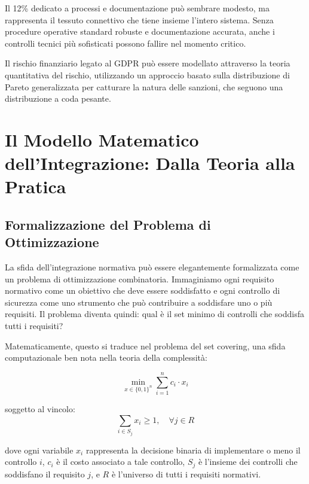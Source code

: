 Il 12\% dedicato a processi e documentazione può sembrare modesto, ma rappresenta il tessuto connettivo che tiene insieme l'intero sistema. Senza procedure operative standard robuste e documentazione accurata, anche i controlli tecnici più sofisticati possono fallire nel momento critico.

Il rischio finanziario legato al GDPR può essere modellato attraverso la teoria quantitativa del rischio\autocite{mcneil2015}, utilizzando un approccio basato sulla distribuzione di Pareto generalizzata per catturare la natura delle sanzioni, che seguono una distribuzione a coda pesante.

\section{Il Modello Matematico dell'Integrazione: Dalla Teoria alla Pratica}

\subsection{Formalizzazione del Problema di Ottimizzazione}

La sfida dell'integrazione normativa può essere elegantemente formalizzata come un problema di ottimizzazione combinatoria. Immaginiamo ogni requisito normativo come un obiettivo che deve essere soddisfatto e ogni controllo di sicurezza come uno strumento che può contribuire a soddisfare uno o più requisiti. Il problema diventa quindi: qual è il set minimo di controlli che soddisfa tutti i requisiti?

Matematicamente, questo si traduce nel problema del set covering, una sfida computazionale ben nota nella teoria della complessità:

\begin{equation}
\min_{x \in \{0,1\}^n} \sum_{i=1}^{n} c_i \cdot x_i
\label{eq:set_covering}
\end{equation}

soggetto al vincolo:
\begin{equation}
\sum_{i \in S_j} x_i \geq 1, \quad \forall j \in R
\label{eq:coverage_constraint}
\end{equation}

dove ogni variabile $x_i$ rappresenta la decisione binaria di implementare o meno il controllo $i$, $c_i$ è il costo associato a tale controllo, $S_j$ è l'insieme dei controlli che soddisfano il requisito $j$, e $R$ è l'universo di tutti i requisiti normativi.

